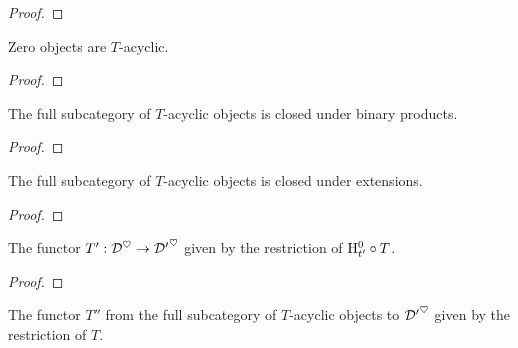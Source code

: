 \begin{proof}
\leanok
\end{proof}


\begin{lemma}
\label{prop-acyclic-zero}
\leanok 
{}
Zero objects are $T$-acyclic.

\end{lemma}

\begin{proof}
\leanok
\end{proof}


\begin{lemma}
\label{prop-acyclic-prod}
\leanok 
{}
The full subcategory of $T$-acyclic objects is closed under binary products.

\end{lemma}

\begin{proof}
\leanok
\end{proof}


\begin{lemma}
\label{prop-acyclic-extension}
\leanok 
{}
The full subcategory of $T$-acyclic objects is closed under extensions.

\end{lemma}

\begin{proof}
\leanok
\end{proof}


\begin{definition}
\label{def-hTh}
The functor $T':\mathcal{D}^\heartsuit\to{\mathcal{D}'}^\heartsuit$ given by the restriction of $\mathrm{H}^0_{t'}\circ T$.

\end{definition}

\begin{proof}
\leanok
\end{proof}


\begin{definition}
\label{def-fromAcyclic}
The functor $T''$ from the full subcategory of $T$-acyclic objects to 
${\mathcal{D}'}^\heartsuit$ given by the restriction of $T$.

\end{definition}



